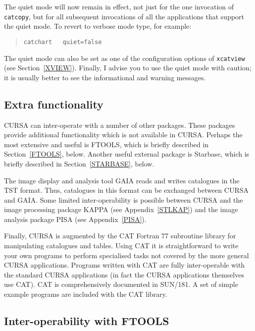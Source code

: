 \documentclass[twoside,11pt]{article}
\newcommand{\xref}[3]{#1}
\renewcommand{\_}{\texttt{\symbol{95}}}
\begin{document}
The quiet mode will now remain in effect, not just for the one invocation
of {\tt catcopy}, but for all subsequent invocations of all the applications
that support the quiet mode.  To revert to verbose mode type, for example:

\begin{verse}
{\tt catchart ~ quiet=false}
\end{verse}

The quiet mode can also be set as one of the configuration options
of {\tt xcatview} (see Section~\ref{XVIEW}).  Finally, I advise you to
use the quiet mode with caution; it is usually better to see the
informational and warning messages.

\subsection{Extra functionality}

CURSA can inter-operate with a number of other packages.  These
packages provide additional functionality which is not available in
CURSA.  Perhaps the most extensive and useful is FTOOLS, which is
briefly described in Section~\ref{FTOOLS}, below.  Another useful
external package is Starbase, which is briefly described in
Section~\ref{STARBASE}, below.

The image display and analysis tool \xref{GAIA}{sun214}{}\cite{SUN214}
reads and writes catalogues in the TST format.  Thus, catalogues in
this format can be exchanged between CURSA and GAIA.  Some limited
inter-operability is possible between CURSA and the image processing
package \xref{KAPPA}{sun95}{}\cite{SUN95} (see Appendix~\ref{STLKAP}) and
the image analysis package \xref{PISA}{sun109}{}\cite{SUN109} (see
Appendix~\ref{PISA}).

Finally, CURSA is augmented by the CAT Fortran 77 subroutine library for
manipulating catalogues and tables.  Using CAT it is straightforward to
write your own programs to perform specialised tasks not covered by the
more general CURSA applications. Programs written with CAT are fully
inter-operable with the standard CURSA applications (in fact the CURSA
applications themselves use CAT). CAT is comprehensively documented in 
\xref{SUN/181}{sun181}{}\cite{SUN181}.  A set of simple example programs
are included with the CAT library.

\subsection{\label{FTOOLS}Inter-operability with FTOOLS}
\end{document}
